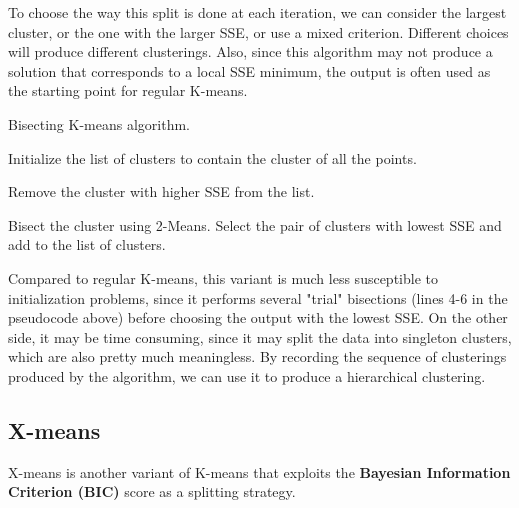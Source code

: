 To choose the way this split is done at each iteration, we can consider the largest cluster, or the one with the larger SSE, or use a mixed criterion. Different choices will produce different clusterings. Also, since this algorithm may not produce a solution that corresponds to a local SSE minimum, the output is often used as the starting point for regular K-means.

\begin{algorithm}
\caption{Bisecting K-means algorithm.}
\begin{algorithmic}[1]

    \State Initialize the list of clusters to contain the cluster of all the points.

    \Repeat
        \State Remove the cluster with higher SSE from the list.

            \State Bisect the cluster using 2-Means.
        \EndFor
        \State Select the pair of clusters with lowest SSE and add to the list of clusters.
        
    
\end{algorithmic}
\end{algorithm}

Compared to regular K-means, this variant is much less susceptible to initialization problems, since it performs several "trial" bisections (lines 4-6 in the pseudocode above) before choosing the output with the lowest SSE. On the other side, it may be time consuming, since it may split the data into singleton clusters, which are also pretty much meaningless. By recording the sequence of clusterings produced by the algorithm, we can use it to produce a hierarchical clustering.

\subsection{X-means}

X-means is another variant of K-means that exploits the \textbf{Bayesian Information Criterion (BIC)} score as a splitting strategy.


